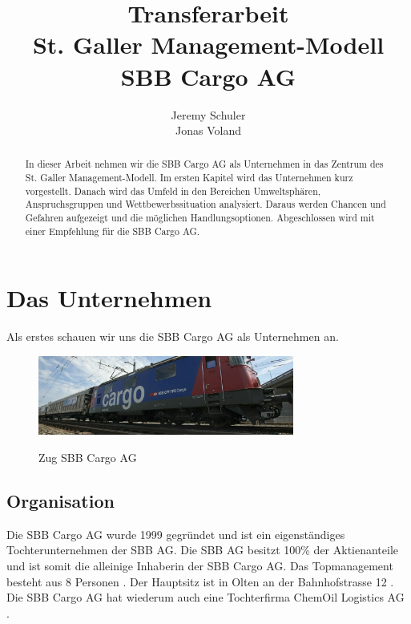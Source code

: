 \documentclass{article}
\title{
    Transferarbeit
    \\St. Galler Management-Modell
    \\SBB Cargo AG}
\author{
    Jeremy Schuler\\
    Jonas Voland
}
\begin{document}
\begin{titlepage}
    \maketitle
\end{titlepage}

\setcounter{page}{2}

\begin{abstract}
In dieser Arbeit nehmen wir die SBB Cargo AG als Unternehmen in das Zentrum des St. Galler Management-Modell.
Im ersten Kapitel wird das Unternehmen kurz vorgestellt.
Danach wird das Umfeld in den Bereichen Umweltsphären, Anspruchsgruppen und Wettbewerbssituation analysiert.
Daraus werden Chancen und Gefahren aufgezeigt und die möglichen Handlungsoptionen.
Abgeschlossen wird mit einer Empfehlung für die SBB Cargo AG.
\end{abstract}

\tableofcontents

\newpage

\section{Das Unternehmen}

Als erstes schauen wir uns die SBB Cargo AG als Unternehmen an.

\begin{figure}[htbp] %
    \centering
    \includegraphics[width=0.75\textwidth]{sbbcargoag} %
    \caption{Zug SBB Cargo AG}\parencite[o. S.]{sbbcargoagBild}
    \label{fig:bildlabel2}
\end{figure}

\subsection{Organisation}

Die SBB Cargo AG wurde 1999 gegründet und ist ein eigenständiges Tochterunternehmen der SBB AG.
Die SBB AG besitzt 100\% der Aktienanteile und ist somit die alleinige Inhaberin der SBB Cargo AG.
Das Topmanagement besteht aus 8 Personen \parencite[o. S.]{managmentOrganigram}.
Der Hauptsitz ist in Olten an der Bahnhofstrasse 12 \parencite[o. S.]{standorte}.
Die SBB Cargo AG hat wiederum auch eine Tochterfirma ChemOil Logistics AG \parencite[o. S.]{chemOil}.
\end{document}
